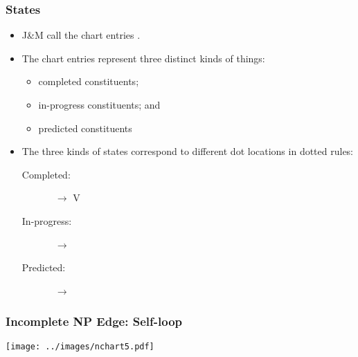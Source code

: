 \begin{frame}[fragile]
  \frametitle{States}

  \begin{itemize}
  \item J\&M call the chart entries .
 
\item The chart entries represent three distinct kinds of things:
  \begin{itemize}
  \item completed constituents;
  \item in-progress constituents; and
  \item predicted constituents
  \end{itemize}

  \item The three kinds of states correspond to different dot locations in
    dotted rules:
    \begin{description}
    \item[Completed:] \VP\ $\rightarrow$ V \,\, \NP \,\,\bigdot
  
    \item[In-progress:] \NP\ $\rightarrow$ \Det \,\,\bigdot \,\, \Nom\
  
    \item[Predicted:] \Se\ $\rightarrow$ \bigdot \,\, \VP
    \end{description}

  \end{itemize}
\end{frame}



\begin{frame}[fragile]
\frametitle{Incomplete NP Edge: Self-loop}

\begin{center}
\texttt{[image: ../images/nchart5.pdf]}  
\end{center}

\end{frame}





